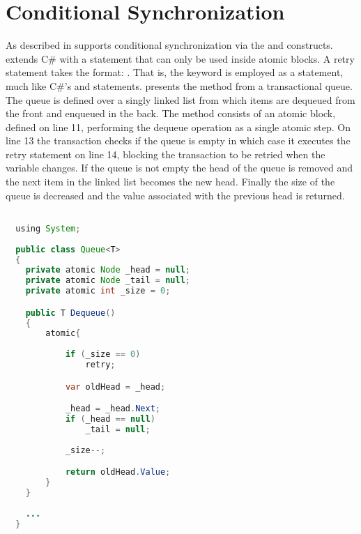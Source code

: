 \section{Conditional Synchronization}\label{sec:sync_design}
As described in  \stmnamesp supports conditional synchronization via the  and  constructs. \stmnamesp extends C\# with a  statement that can only be used inside atomic blocks. A retry statement takes the format: . That is, the keyword is employed as a statement, much like C\#'s  and  statements\cite[p. 102]{sestoft2011c}.  presents the  method from a transactional queue. The queue is defined over a singly linked list from which items are dequeued from the front and enqueued in the back. The  method consists of an atomic block, defined on line 11, performing the dequeue operation as a single atomic step. On line 13 the transaction checks if the queue is empty in which case it executes the retry statement on line 14, blocking the transaction to be retried when the  variable changes. If the queue is not empty the head of the queue is removed and the next item in the linked list becomes the new head. Finally the size of the queue is decreased and the value associated with the previous head is returned. 

\begin{lstlisting}[label=lst:stm_atomic_syntax_retry,
  caption={Retry Syntax},
  language=Java,  
  showspaces=false,
  showtabs=false,
  breaklines=true,
  showstringspaces=false,
  breakatwhitespace=true,
  commentstyle=\color{greencomments},
  keywordstyle=\color{bluekeywords},
  stringstyle=\color{redstrings},
  morekeywords={atomic, retry, orElse, var, get, set, using}]  % Start your code-block

  using System;
  
  public class Queue<T>
  {
  	private atomic Node _head = null;
  	private atomic Node _tail = null;
  	private atomic int _size = 0;

  	public T Dequeue()
  	{
  		atomic{
  		
  			if (_size == 0)
  				retry;

  			var oldHead = _head;

  			_head = _head.Next;
  			if (_head == null)
  				_tail = null;
  			
  			_size--;

  			return oldHead.Value;
  		}
  	}
  	
  	...
  }
\end{lstlisting}

